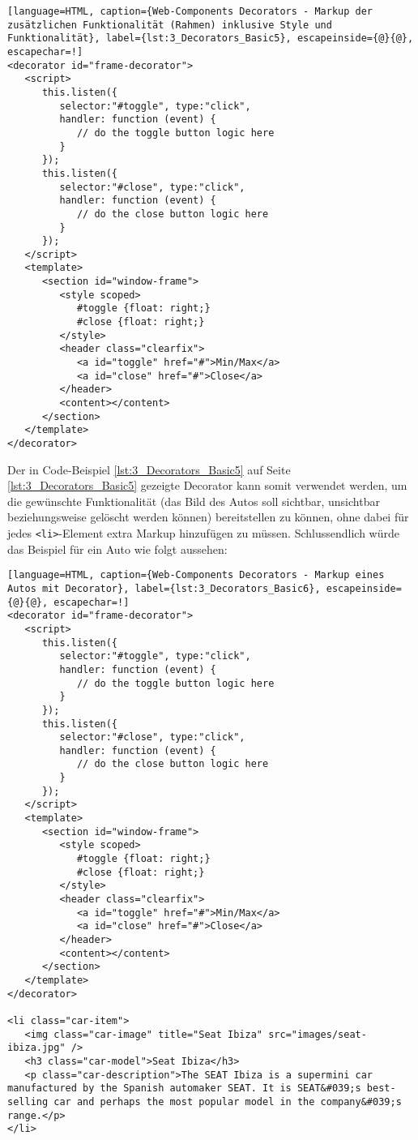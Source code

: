 \begin{lstlisting}[language=HTML, caption={Web-Components Decorators - Markup der zusätzlichen Funktionalität (Rahmen) inklusive Style und Funktionalität}, label={lst:3_Decorators_Basic5}, escapeinside={@}{@}, escapechar=!]
<decorator id="frame-decorator">
   <script>
      this.listen({
         selector:"#toggle", type:"click",
         handler: function (event) {
            // do the toggle button logic here
         }
      });
      this.listen({
         selector:"#close", type:"click",
         handler: function (event) {
            // do the close button logic here
         }
      });
   </script>
   <template>
      <section id="window-frame">
         <style scoped>
            #toggle {float: right;}
            #close {float: right;}
         </style>
         <header class="clearfix">
            <a id="toggle" href="#">Min/Max</a>
            <a id="close" href="#">Close</a>
         </header>
         <content></content>
      </section>
   </template>
</decorator>
\end{lstlisting}


Der in Code-Beispiel \ref{lst:3_Decorators_Basic5} auf Seite \ref{lst:3_Decorators_Basic5} gezeigte Decorator kann somit verwendet werden, um die gewünschte Funktionalität (das Bild des Autos soll sichtbar, unsichtbar beziehungsweise gelöscht werden können) bereitstellen zu können, ohne dabei für jedes \lstinline|<li>|-Element extra Markup hinzufügen zu müssen. Schlussendlich würde das Beispiel für ein Auto wie folgt aussehen:

\begin{lstlisting}[language=HTML, caption={Web-Components Decorators - Markup eines Autos mit Decorator}, label={lst:3_Decorators_Basic6}, escapeinside={@}{@}, escapechar=!]
<decorator id="frame-decorator">
   <script>
      this.listen({
         selector:"#toggle", type:"click",
         handler: function (event) {
            // do the toggle button logic here
         }
      });
      this.listen({
         selector:"#close", type:"click",
         handler: function (event) {
            // do the close button logic here
         }
      });
   </script>
   <template>
      <section id="window-frame">
         <style scoped>
            #toggle {float: right;}
            #close {float: right;}
         </style>
         <header class="clearfix">
            <a id="toggle" href="#">Min/Max</a>
            <a id="close" href="#">Close</a>
         </header>
         <content></content>
      </section>
   </template>
</decorator>

<li class="car-item">
   <img class="car-image" title="Seat Ibiza" src="images/seat-ibiza.jpg" />
   <h3 class="car-model">Seat Ibiza</h3>
   <p class="car-description">The SEAT Ibiza is a supermini car manufactured by the Spanish automaker SEAT. It is SEAT&#039;s best-selling car and perhaps the most popular model in the company&#039;s range.</p>
</li>
\end{lstlisting}

